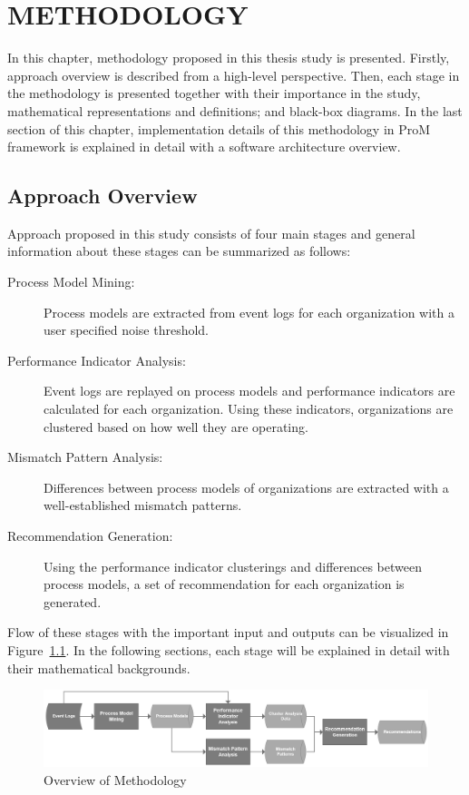 \chapter{METHODOLOGY}
\label{chp:methodology}

In this chapter, methodology proposed in this thesis study is presented. Firstly, approach overview is described from a high-level perspective. Then, each stage in the methodology is presented together with their importance in the study, mathematical representations and definitions; and black-box diagrams. In the last section of this chapter, implementation details of this methodology in ProM framework is explained in detail with a software architecture overview.

\section{Approach Overview}
\label{sec:approach-overview}
Approach proposed in this study consists of four main stages and general information about these stages can be summarized as follows:
\begin{description}
	\item[Process Model Mining:] Process models are extracted from event logs for each organization with a user specified noise threshold.
	\item[Performance Indicator Analysis:] Event logs are replayed on process models and performance indicators are calculated for each organization. Using these indicators, organizations are clustered based on how well they are operating.
	\item[Mismatch Pattern Analysis:] Differences between process models of organizations are extracted with a well-established mismatch patterns.
	\item[Recommendation Generation:] Using the performance indicator clusterings and differences between process models, a set of recommendation for each organization is generated.
\end{description}

Flow of these stages with the important input and outputs can be visualized in Figure~\ref{fig:approach-overview}. In the following sections, each stage will be explained in detail with their mathematical backgrounds.
\begin{figure}
  \centering
  \includegraphics[width=\textwidth]{4_methodology/approach-overview}
  \caption{Overview of Methodology}
  \label{fig:approach-overview}
\end{figure}

